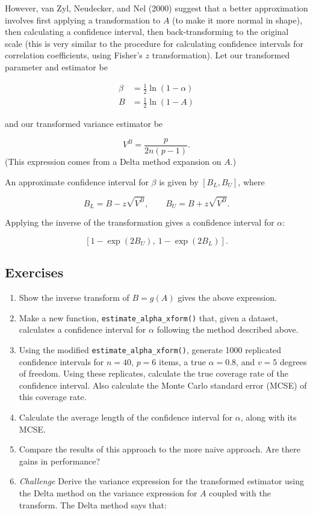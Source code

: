 \documentclass[
]{book}
\begin{document}
However, van Zyl, Neudecker, and Nel (2000) suggest that a better approximation involves first applying a transformation to \(A\) (to make it more normal in shape), then calculating a confidence interval, then back-transforming to the original scale (this is very similar to the procedure for calculating confidence intervals for correlation coefficients, using Fisher's \(z\) transformation). Let our transformed parameter and estimator be

\[
\begin{aligned}
\beta &= \frac{1}{2} \ln\left(1 - \alpha\right) \\
B &= \frac{1}{2} \ln\left(1 - A\right)
\end{aligned}
\]

and our transformed variance estimator be

\[
V^B = \frac{p}{2 n (p - 1)}.
\]
(This expression comes from a Delta method expansion on \(A\).)

An approximate confidence interval for \(\beta\) is given by \([B_L, B_U]\), where

\[
B_L = B - z \sqrt{V^B}, \qquad B_U = B + z \sqrt{V^B}.
\]

Applying the inverse of the transformation gives a confidence interval for \(\alpha\):

\[
\left[1 - \exp(2B_U), \ 1 - \exp(2 B_L)\right].
\]

\hypertarget{exercises-3}{%
\subsection{Exercises}\label{exercises-3}}

\begin{enumerate}
\def\labelenumi{\arabic{enumi}.}
\item
  Show the inverse transform of \(B = g(A)\) gives the above expression.
\item
  Make a new function, \texttt{estimate\_alpha\_xform()} that, given a dataset, calculates a confidence interval for \(\alpha\) following the method described above.
\item
  Using the modified \texttt{estimate\_alpha\_xform()}, generate 1000 replicated confidence intervals for \(n = 40\), \(p = 6\) items, a true \(\alpha = 0.8\), and \(v = 5\) degrees of freedom. Using these replicates, calculate the true coverage rate of the confidence interval. Also calculate the Monte Carlo standard error (MCSE) of this coverage rate.
\item
  Calculate the average length of the confidence interval for \(\alpha\), along with its MCSE.
\item
  Compare the results of this approach to the more naive approach. Are there gains in performance?
\item
  \emph{Challenge} Derive the variance expression for the transformed estimator using the Delta method on the variance expression for \(A\) coupled with the transform. The Delta method says that:
\end{enumerate}
\end{document}

